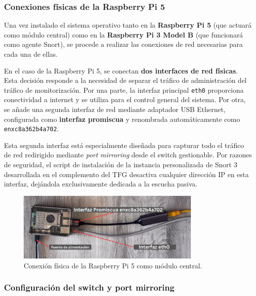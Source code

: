 \documentclass[11pt,a4paper,twoside]{report}
\begin{document}
\subsubsection{Conexiones físicas de la Raspberry Pi 5}

Una vez instalado el sistema operativo tanto en la \textbf{Raspberry Pi 5} (que actuará como módulo central) como en la \textbf{Raspberry Pi 3 Model B} (que funcionará como agente Snort), se procede a realizar las conexiones de red necesarias para cada una de ellas.\newline

En el caso de la Raspberry Pi 5, se conectan \textbf{dos interfaces de red físicas}. Esta decisión responde a la necesidad de separar el tráfico de administración del tráfico de monitorización. Por una parte, la interfaz principal \texttt{eth0} proporciona conectividad a internet y se utiliza para el control general del sistema. Por otra, se añade una segunda interfaz de red mediante adaptador USB Ethernet, configurada como \textbf{interfaz promiscua} y renombrada automáticamente como \texttt{enxc8a362b4a702}.\newline

Esta segunda interfaz está especialmente diseñada para capturar todo el tráfico de red redirigido mediante \textit{port mirroring} desde el switch gestionable. Por razones de seguridad, el script de instalación de la instancia personalizada de Snort 3 desarrollada en el complemento del TFG desactiva cualquier dirección IP en esta interfaz, dejándola exclusivamente dedicada a la escucha pasiva.

\begin{figure}[H]
	\centering
	\includegraphics[width=0.8\textwidth]{install/0.1.png}
	\caption{Conexión física de la Raspberry Pi 5 como módulo central.}
	\label{fig:conexion-central-rpi5}
\end{figure}


\subsubsection{Configuración del switch y port mirroring}
\end{document}
